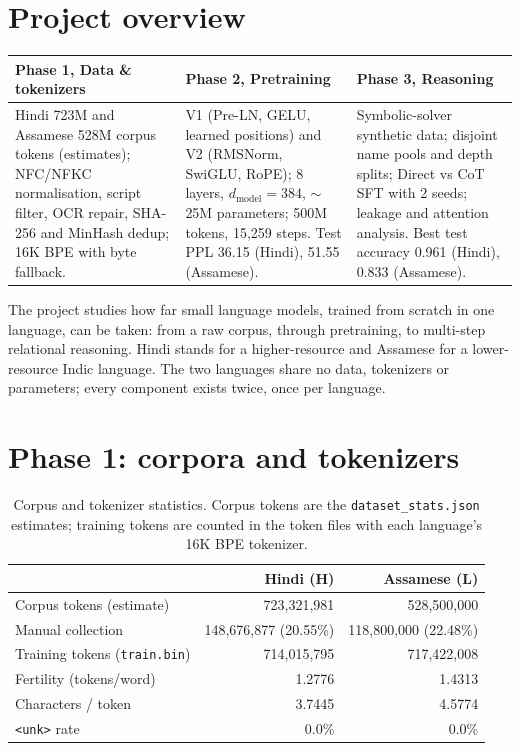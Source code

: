 \documentclass[11pt,a4paper]{article}
\begin{document}
\section{Project overview}

\begin{table}[H]
\centering\small
\begin{tabular}{@{}>{\raggedright\arraybackslash}p{}>{\raggedright\arraybackslash}p{}>{\raggedright\arraybackslash}p{}@{}}
\toprule
\textbf{Phase 1, Data \& tokenizers} & \textbf{Phase 2, Pretraining} & \textbf{Phase 3, Reasoning} \\
\midrule
Hindi 723M and Assamese 528M corpus tokens (estimates); NFC/NFKC normalisation, script filter, OCR repair, SHA-256 and MinHash dedup; 16K BPE with byte fallback. &
V1 (Pre-LN, GELU, learned positions) and V2 (RMSNorm, SwiGLU, RoPE); 8 layers, $d_{\text{model}}{=}384$, $\sim$25M parameters; 500M tokens, 15,259 steps. Test PPL 36.15 (Hindi), 51.55 (Assamese). &
Symbolic-solver synthetic data; disjoint name pools and depth splits; Direct vs CoT SFT with 2 seeds; leakage and attention analysis. Best test accuracy 0.961 (Hindi), 0.833 (Assamese). \\
\bottomrule
\end{tabular}
\end{table}

\noindent The project studies how far small language models, trained from scratch in one language, can be taken: from a raw corpus, through pretraining, to multi-step relational reasoning. Hindi stands for a higher-resource and Assamese for a lower-resource Indic language. The two languages share no data, tokenizers or parameters; every component exists twice, once per language.

\section{Phase 1: corpora and tokenizers}

\begin{table}[H]
\centering\small
\caption{Corpus and tokenizer statistics. Corpus tokens are the \texttt{dataset\_stats.json} estimates; training tokens are counted in the token files with each language's 16K BPE tokenizer.}
\begin{tabular}{@{}lrr@{}}
\toprule
 & \textbf{Hindi (H)} & \textbf{Assamese (L)} \\
\midrule
Corpus tokens (estimate) & 723,321,981 & 528,500,000 \\
Manual collection & 148,676,877 (20.55\%) & 118,800,000 (22.48\%) \\
Training tokens (\texttt{train.bin}) & 714,015,795 & 717,422,008 \\
Fertility (tokens/word) & 1.2776 & 1.4313 \\
Characters / token & 3.7445 & 4.5774 \\
\texttt{<unk>} rate & 0.0\% & 0.0\% \\
\bottomrule
\end{tabular}
\label{tab:p1}
\end{table}
\end{document}
